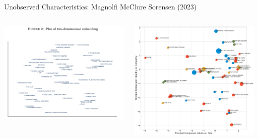 \documentclass[aspectratio=169,10pt]{beamer}
\begin{document}
\begin{frame}{Unobserved Characteristics: Magnolfi McClure Sorensen (2023)}
\begin{columns}
\begin{column}{0.5\textwidth}
     \includegraphics[width=\textwidth]{resources/embeddings_2}      
\end{column}
\begin{column}{0.5\textwidth}
     \includegraphics[width=\textwidth]{resources/pca_01}
\end{column}
\end{columns}
\end{frame}
\end{document}
